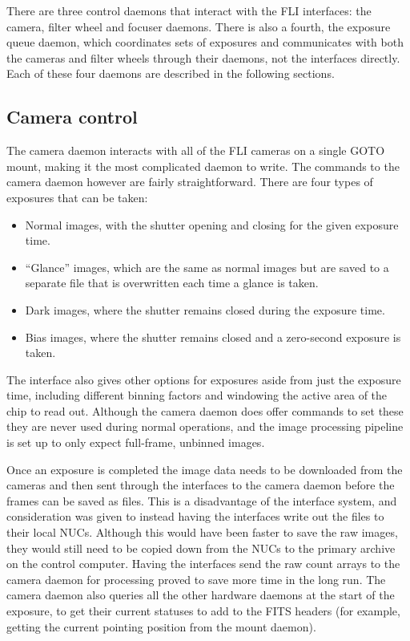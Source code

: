 \begin{colsection}
\begin{colsection}
\newpage

There are three control daemons that interact with the FLI interfaces: the camera, filter wheel and focuser daemons. There is also a fourth, the exposure queue daemon, which coordinates sets of exposures and communicates with both the cameras and filter wheels through their daemons, not the interfaces directly. Each of these four daemons are described in the following sections.

\end{colsection}


\subsection{Camera control}
\label{sec:cam}
\begin{colsection}

The camera daemon interacts with all of the FLI cameras on a single GOTO mount, making it the most complicated daemon to write. The commands to the camera daemon however are fairly straightforward. There are four types of exposures that can be taken:

\begin{itemize}
    \item Normal images, with the shutter opening and closing for the given exposure time.
    \item ``Glance'' images, which are the same as normal images but are saved to a separate file that is overwritten each time a glance is taken.
    \item Dark images, where the shutter remains closed during the exposure time.
    \item Bias images, where the shutter remains closed and a zero-second exposure is taken.
\end{itemize}

The  interface also gives other options for exposures aside from just the exposure time, including different binning factors and windowing the active area of the chip to read out. Although the camera daemon does offer commands to set these they are never used during normal operations, and the image processing pipeline is set up to only expect full-frame, unbinned images.

Once an exposure is completed the image data needs to be downloaded from the cameras and then sent through the interfaces to the camera daemon before the frames can be saved as  files. This is a disadvantage of the interface system, and consideration was given to instead having the interfaces write out the files to their local NUCs. Although this would have been faster to save the raw images, they would still need to be copied down from the NUCs to the primary archive on the control computer. Having the interfaces send the raw count arrays to the camera daemon for processing proved to save more time in the long run. The camera daemon also queries all the other hardware daemons at the start of the exposure, to get their current statuses to add to the FITS headers (for example, getting the current pointing position from the mount daemon). 


\end{colsection}
\end{colsection}
